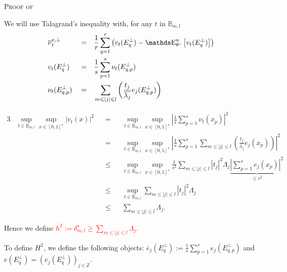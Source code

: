 \begin{pro}{\textsc{Proof of }\\}\label{PROD.5.4}

We will use Talagrand's inequality with, for any $t$ in $\mathds{B}_{m, l}$
\begin{alignat*}{3}
& \overline{\nu}^{e, \perp}_{t} && = && \frac{1}{r} \sum\limits_{q = 1}^{r} \left(v_{t}(E^{\perp}_{q}) - \E_{\theta^{\circ}}^{n}\left[v_{t}(E^{\perp}_{q})\right]\right)\\
& v_{t}(E^{\perp}_{q}) && = && \frac{1}{s} \sum\limits_{p = 1}^{s} \nu_{t}(E^{\perp}_{q, p})\\
& \nu_{t}(E^{\perp}_{q, p}) && = && \sum\limits_{m \leq \vert j \vert \leq l} \left(\frac{t_{j}}{\overline{\lambda_{j}}} e_{j}(E^{\perp}_{q, p})\right)
\end{alignat*}

\begin{alignat*}{3}
& \sup\limits_{t \in \mathds{B}_{m,l}} \sup\limits_{x \in [0, 1]^{s}} \vert v_{t}(x) \vert^{2} && = && \sup\limits_{t \in \mathds{B}_{m,l}} \sup\limits_{x \in [0, 1]^{s}} \left\vert \frac{1}{s} \sum\limits_{p = 1}^{s} \nu_{t}(x_{p}) \right\vert^{2}\\
& && = && \sup\limits_{t \in \mathds{B}_{m,l}} \sup\limits_{x \in [0, 1]^{s}} \left\vert \frac{1}{s} \sum\limits_{p = 1}^{s} \sum\limits_{m \leq \vert j \vert \leq l} \left(\frac{t_{j}}{\overline{\lambda_{j}}} e_{j}(x_{p})\right) \right\vert^{2}\\
& && \leq && \sup\limits_{t \in \mathds{B}_{m,l}} \sup\limits_{x \in [0, 1]^{s}} \frac{1}{s^{2}}  \sum\limits_{m \leq \vert j \vert \leq l} \left\vert t_{j} \right\vert^{2} \Lambda_{j} \underbrace{\left\vert \sum\limits_{p = 1}^{s} e_{j}(x_{p}) \right\vert^{2}}_{\leq s^{2}}\\
& && \leq && \sup\limits_{t \in \mathds{B}_{m,l}} \sum\limits_{m \leq \vert j \vert \leq l} \left\vert t_{j} \right\vert^{2} \Lambda_{j}\\
& && \leq && \sum\limits_{m \leq \vert j \vert \leq l} \Lambda_{j}.
\end{alignat*}

Hence we define \textcolor{red}{$h^{2} := \delta^{\star}_{m, l} \geq \sum\limits_{m \leq \vert j \vert \leq l} \Lambda_{j}$.}

\medskip

To define $H^{2}$, we define the following objects: $\overline{e}_{j}(E_{q}^{\perp}) := \frac{1}{s} \sum\limits_{p = 1}^{s} e_{j}(E^{\perp}_{q, p})$ and $\overline{e}(E_{q}^{\perp}) = \left(\overline{e}_{j}(E_{q}^{\perp})\right)_{j \in \mathds{Z}}$.


\end{pro}
